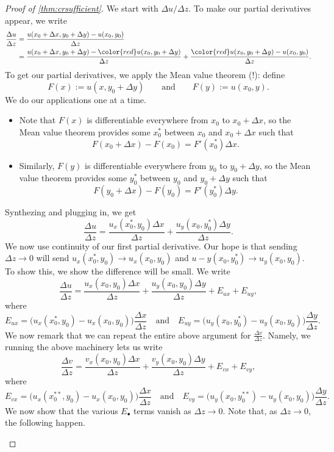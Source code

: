 \begin{proof}[Proof of \autoref{thm:crsufficient}]
	We start with $\Delta u/\Delta z$. To make our partial derivatives appear, we write
	\begin{align*}
		\frac{\Delta u}{\Delta z} &= \frac{u(x_0+\Delta x,y_0+\Delta y)-u(x_0,y_0)}{\Delta z} \\
		&= \frac{u(x_0+\Delta x,y_0+\Delta y)-{\color{red}u(x_0,y_0+\Delta y)}}{\Delta z}+\frac{{\color{red}u(x_0,y_0+\Delta y)}-u(x_0,y_0)}{\Delta z}.
	\end{align*}
	To get our partial derivatives, we apply the Mean value theorem (!): define
	\[F(x):=u(x,y_0+\Delta y)\qquad\text{and}\qquad F(y):=u(x_0,y).\]
	We do our applications one at a time.
	\begin{itemize}
		\item Note that $F(x)$ is differentiable everywhere from $x_0$ to $x_0+\Delta x$, so the Mean value theorem provides some $x_0^*$ between $x_0$ and $x_0+\Delta x$ such that
		\[F(x_0+\Delta x)-F(x_0)=F'(x_0^*)\Delta x.\]
		\item Similarly, $F(y)$ is differentiable everywhere from $y_0$ to $y_0+\Delta y$, so the Mean value theorem provides some $y_0^*$ between $y_0$ and $y_0+\Delta y$ such that
		\[F(y_0+\Delta x)-F(y_0)=F'(y_0^*)\Delta y.\]
	\end{itemize}
	Synthezing and plugging in, we get
	\[\frac{\Delta u}{\Delta z}=\frac{u_x(x_0^*,y_0)\Delta x}{\Delta z}+\frac{u_y(x_0,y_0^*)\Delta y}{\Delta z}.\]
	We now use continuity of our first partial derivative. Our hope is that sending $\Delta z\to0$ will send $u_x(x_0^*,y_0)\to u_x(x_0,y_0)$ and $u-y(x_0,y_0^*)\to u_y(x_0,y_0)$. To show this, we show the difference will be small. We write
	\[\frac{\Delta u}{\Delta z}=\frac{u_x(x_0,y_0)\Delta x}{\Delta z}+\frac{u_y(x_0,y_0)\Delta y}{\Delta z}+E_{ux}+E_{uy},\]
	where
	\[E_{ux}=\big(u_x(x_0^*,y_0)-u_x(x_0,y_0)\big)\frac{\Delta x}{\Delta z}\quad\text{and}\quad E_{uy}=\big(u_y(x_0,y_0^*)-u_y(x_0,y_0)\big)\frac{\Delta y}{\Delta z}.\]
	We now remark that we can repeat the entire above argument for $\frac{\Delta v}{\Delta z}$. Namely, we running the above machinery lets us write
	\[\frac{\Delta v}{\Delta z}=\frac{v_x(x_0,y_0)\Delta x}{\Delta z}+\frac{v_y(x_0,y_0)\Delta y}{\Delta z}+E_{vx}+E_{vy},\]
	where
	\[E_{vx}=\big(u_x(x_0^{**},y_0)-u_x(x_0,y_0)\big)\frac{\Delta x}{\Delta z}\quad\text{and}\quad E_{vy}=\big(u_y(x_0,y_0^{**})-u_y(x_0,y_0)\big)\frac{\Delta y}{\Delta z}.\]
	We now show that the various $E_\bullet$ terms vanish as $\Delta z\to0$. Note that, as $\Delta z\to0$, the following happen.
	\begin{itemize}

\end{itemize}
\end{proof}
